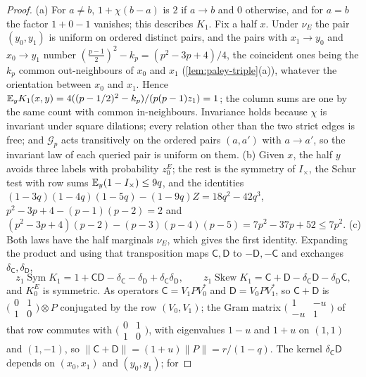 \begin{proof}
(a) For $a\ne b$, $1+\chi(b-a)$ is $2$ if $a\to b$ and $0$ otherwise, and for
$a=b$ the factor $1+0-1$ vanishes; this describes $K_1$. Fix a half $x$. Under
$\nu_E$ the pair $(y_0,y_1)$ is uniform on ordered distinct pairs, and the pairs
with $x_1\to y_0$ and $x_0\to y_1$ number $(\frac{p-1}2)^2-k_p=(p^2-3p+4)/4$, the
coincident ones being the $k_p$ common out-neighbours of $x_0$ and $x_1$
(\cref{lem:paley-triple}(a)), whatever the orientation between $x_0$ and $x_1$.
Hence $\mathbb E_yK_1(x,y)=4((p-1/2)^2-k_p)/(p(p-1)z_1)=1$; the column sums are
one by the same count with common in-neighbours. Invariance holds because $\chi$
is invariant under square dilations; every relation other than the two strict
edges is free; and $\mathcal G_p$ acts transitively on the ordered pairs $(a,a')$
with $a\to a'$, so the invariant law of each queried pair is uniform on them.
(b) Given $x$, the half $y$ avoids three labels with probability $z^E_0$; the rest
is the symmetry of $I_\times$, the Schur test with row sums
$\mathbb E_y(1-I_\times)\le9q$, and the identities
$(1-3q)(1-4q)(1-5q)-(1-9q)Z=18q^2-42q^3$, $p^2-3p+4-(p-1)(p-2)=2$ and
$(p^2-3p+4)(p-2)-(p-3)(p-4)(p-5)=7p^2-37p+52\le7p^2$.
(c) Both laws have the half marginals $\nu_E$, which gives the first identity.
Expanding the product and using that transposition maps $\mathsf C,\mathsf D$
to $-\mathsf D,-\mathsf C$ and exchanges $\delta_{\mathsf C},\delta_{\mathsf D}$,
\[
 z_1\operatorname{Sym}K_1=1+\mathsf C\mathsf D-\delta_{\mathsf C}-\delta_{\mathsf D}
 +\delta_{\mathsf C}\delta_{\mathsf D},\qquad
 z_1\operatorname{Skew}K_1=\mathsf C+\mathsf D-\delta_{\mathsf C}\mathsf D
 -\delta_{\mathsf D}\mathsf C,
\]
and $K^E_0$ is symmetric. As operators $\mathsf C=V_1PV_0^*$ and
$\mathsf D=V_0PV_1^*$, so $\mathsf C+\mathsf D$ is
$\bigl(\begin{smallmatrix}0&1\\1&0\end{smallmatrix}\bigr)\otimes P$ conjugated by the
row $(V_0,V_1)$; the Gram matrix
$\bigl(\begin{smallmatrix}1&-u\\-u&1\end{smallmatrix}\bigr)$ of that row commutes with
$\bigl(\begin{smallmatrix}0&1\\1&0\end{smallmatrix}\bigr)$, with eigenvalues $1-u$ and
$1+u$ on $(1,1)$ and $(1,-1)$, so $\|\mathsf C+\mathsf D\|=(1+u)\|P\|=r/(1-q)$. The
kernel $\delta_{\mathsf C}\mathsf D$ depends on $(x_0,x_1)$ and $(y_0,y_1)$; for

\end{proof}
